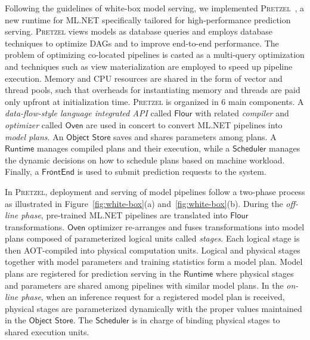 \documentclass[11pt]{article}
\newcommand{\pretzel}{\textsc{Pretzel}\xspace}
\newcommand{\mlnet}{ML.NET\xspace}
\newcommand{\at}[1]{\protect\ensuremath{\mathsf{#1}}\xspace}
\begin{document}
Following the guidelines of white-box model serving, we implemented \pretzel~\cite{pretzel-osdi,iccd}, a new runtime for \mlnet specifically tailored for high-performance prediction serving.
\pretzel views models as data\-base queries and employs database techniques to optimize DAGs and to improve end-to-end performance. The problem of optimizing co-located pipelines is casted as a multi-query optimization and techniques such as view materialization are employed to speed up pipeline execution. Memory and CPU resources are shared in the form of vector and thread pools, such that overheads for instantiating memory and threads are paid only upfront at initialization time.
\pretzel is organized in 6 main components. A \emph{data-flow-style language integrated API} called \at{Flour} with related \emph{compiler} and \emph{optimizer} called \at{Oven} are used in concert to convert \mlnet pipelines into \emph{model plans}. An \at{Object} \at{Store} saves and shares parameters among plans. A \at{Runtime} manages compiled plans and their execution, while a \at{Scheduler} manages the dynamic decisions on how to schedule plans based on machine workload. Finally, a \at{FrontEnd} is used to submit prediction requests to the system. 

In \pretzel, deployment and serving of model pipelines follow a two-phase process as illustrated in Figure~\ref{fig:white-box}(a) and~\ref{fig:white-box}(b). 
During the \emph{off-line phase}, pre-trained \mlnet pipelines are translated into \at{Flour} transformations. \at{Oven} optimizer re-arranges and fuses transformations into model plans composed of parameterized logical units called \emph{stages}. Each logical stage is then AOT-compiled into physical computation units.
Logical and physical stages together with model parameters and training statistics form a model plan. %
Model plans are registered for prediction serving in the \at{Runtime} where physical stages and parameters are shared among pipelines with similar model plans. In the \emph{on-line phase}, when an inference request for a registered model plan is received, physical stages are parameterized dynamically with the proper values maintained in the \at{Object} \at{Store}. The \at{Scheduler} is in charge of binding physical stages to shared execution units.
\end{document}
